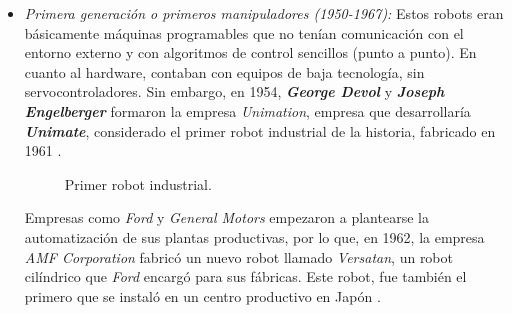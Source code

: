 \begin{itemize}
  \item \textit{Primera generación o primeros manipuladores (1950-1967):} Estos robots eran básicamente máquinas programables que no tenían comunicación con el entorno externo y con algoritmos de control sencillos (punto a punto). En cuanto al hardware, contaban con equipos de baja tecnología, sin servocontroladores. Sin embargo, en 1954, \textbf{\emph{George Devol}} y \textbf{\emph{Joseph Engelberger}} formaron la empresa \emph{Unimation}, empresa que desarrollaría \textbf{\emph{Unimate}}, considerado el primer robot industrial de la historia, fabricado en 1961 \cite{Zamalloa17}.
  
  \begin{figure}[h!]
    \begin{center}
      \subcapcentertrue
      \hspace{2mm}
    \end{center}
    \caption{Primer robot industrial.}
    \label{fig:primer_robot_industrial}
  \end{figure}
  
  \pagebreak
  
  Empresas como \emph{Ford} y \emph{General Motors} empezaron a plantearse la automatización de sus plantas productivas, por lo que, en 1962, la empresa \emph{AMF Corporation} fabricó un nuevo robot llamado \textit{Versatan}, un robot cilíndrico que \emph{Ford} encargó para sus fábricas.
Este robot, fue también el primero que se instaló en un centro productivo en Japón \cite{Gasparetto19}. 


\end{itemize}
